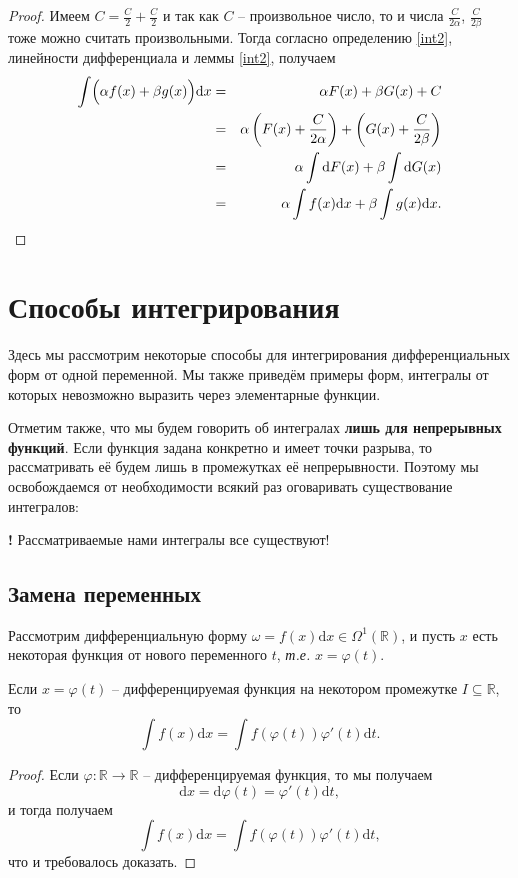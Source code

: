 \begin{proof}
Имеем $C = \frac{C}{2} + \frac{C}{2}$ и так как $C$ -- произвольное число, то и числа $\frac{C}{2\alpha}$, $\frac{C}{2\beta}$ тоже можно считать произвольными. Тогда согласно определению \ref{int2}, линейности дифференциала и леммы \ref{int2}, получаем
\begin{eqnarray*}
    \int \Bigl(\alpha f(x) + \beta g(x) \Bigr) \mathrm{d}x &=& \alpha F(x) + \beta G(x) + C \\
    &=& \alpha \left( F(x) + \frac{C}{2\alpha} \right) + \left(G(x) + \frac{C}{2\beta} \right) \\
    &=&\alpha \int \mathrm{d}F(x) + \beta \int \mathrm{d}G(x) \\
    &=& \alpha \int f(x) \mathrm{d}x + \beta \int g(x) \mathrm{d}x.
\end{eqnarray*}
\end{proof}

\section{Способы интегрирования}

Здесь мы рассмотрим некоторые способы для интегрирования дифференциальных форм от одной переменной. Мы также приведём примеры форм, интегралы от которых невозможно выразить через элементарные функции.

Отметим также, что мы будем говорить об интегралах \textbf{лишь для непрерывных функций}. Если функция задана конкретно и имеет точки разрыва, то рассматривать её будем лишь в промежутках её непрерывности. Поэтому мы освобождаемся от необходимости всякий раз оговаривать существование интегралов: 

\begin{mydanger}{\bf{!}}
    Рассматриваемые нами интегралы все существуют!
\end{mydanger}

\subsection{Замена переменных}

Рассмотрим дифференциальную форму $\omega  = f(x) \mathrm{d}x \in \Omega^1(\mathbb{R})$, и пусть $x$ есть некоторая функция от нового переменного $t$, \textit{т.е.} $x = \varphi(t)$.

\begin{theorem}\label{replace_in_int}
    Если $x = \varphi(t)$ -- дифференцируемая функция на некотором промежутке $I \subseteq \mathbb{R}$, то
    \[
     \int f(x) \mathrm{d}x = \int f(\varphi(t)) \varphi'(t) \mathrm{d}t.
    \]
\end{theorem}
\begin{proof}
 Если $\varphi:\mathbb{R} \to \mathbb{R}$ -- дифференцируемая функция, то мы получаем
\[
 \mathrm{d} x = \mathrm{d} \varphi(t) = \varphi'(t)\mathrm{d}t,
\]
и тогда получаем
\[
 \int f(x) \mathrm{d}x = \int f(\varphi(t)) \varphi'(t) \mathrm{d}t,
\]
что и требовалось доказать.
\end{proof}


